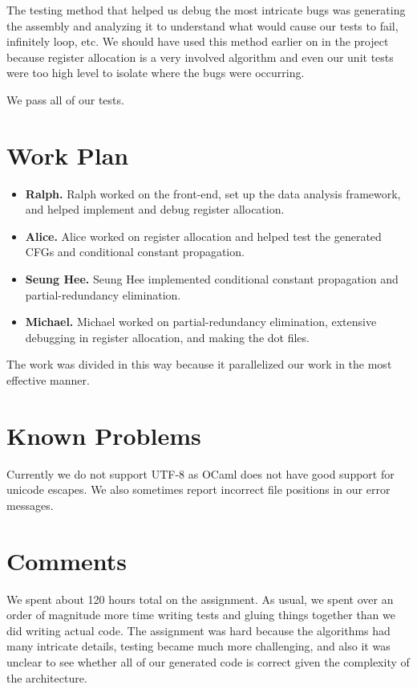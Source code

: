 \documentclass{hw}
\begin{document}
The testing method that helped us debug the most intricate bugs was generating the assembly and analyzing it to understand what would cause our tests to fail, infinitely loop, etc. We should have used this method earlier on in the project because register allocation is a very involved algorithm and even our unit tests were too high level to isolate where the bugs were occurring.

We pass all of our tests.
\section{Work Plan}\label{sec:workplan}
\begin{itemize}
  \item \textbf{Ralph.}
    Ralph worked on the front-end, set up the data analysis framework, and helped implement and debug register allocation.

  \item \textbf{Alice.}
    Alice worked on register allocation and helped test the generated CFGs and conditional constant propagation.

  \item \textbf{Seung Hee.}
    Seung Hee implemented conditional constant propagation and partial-redundancy elimination.

  \item \textbf{Michael.}
    Michael worked on partial-redundancy elimination, extensive debugging in register allocation, and making the dot files.
\end{itemize}

The work was divided in this way because it parallelized our work in the most
effective manner.

\section{Known Problems}\label{sec:problems}
Currently we do not support UTF-8 as OCaml does not have good support for
unicode escapes. We also sometimes report incorrect file positions in our error
messages.

\section{Comments}\label{sec:comments}
We spent about 120 hours total on the assignment. As usual, we spent over an
order of magnitude more time writing tests and gluing things together than we
did writing actual code. The assignment was hard because the algorithms had many intricate details, testing became much
more challenging, and also it was unclear to see whether all of our generated
code is correct given the complexity of the architecture.
\end{document}
